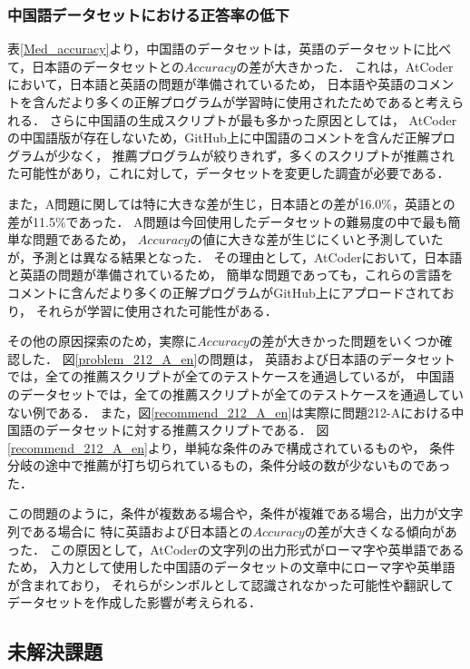   \subsubsection{中国語データセットにおける正答率の低下}
  表\ref{Med_accuracy}より，中国語のデータセットは，英語のデータセットに比べて，日本語のデータセットとの$Accuracy$の差が大きかった．
  これは，AtCoder\cite{AtCoder}において，日本語と英語の問題が準備されているため，
  日本語や英語のコメントを含んだより多くの正解プログラムが学習時に使用されたためであると考えられる．
  さらに中国語の生成スクリプトが最も多かった原因としては，
  AtCoderの中国語版が存在しないため，GitHub上に中国語のコメントを含んだ正解プログラムが少なく，
  推薦プログラムが絞りきれず，多くのスクリプトが推薦された可能性があり，これに対して，データセットを変更した調査が必要である．
  
  また，A問題に関しては特に大きな差が生じ，日本語との差が16.0\%，英語との差が11.5\%であった．
  A問題は今回使用したデータセットの難易度の中で最も簡単な問題であるため，
  $Accuracy$の値に大きな差が生じにくいと予測していたが，予測とは異なる結果となった．
  その理由として，AtCoder\cite{AtCoder}において，日本語と英語の問題が準備されているため，
  簡単な問題であっても，これらの言語をコメントに含んだより多くの正解プログラムがGitHub上にアプロードされており，
  それらが学習に使用された可能性がある．

  その他の原因探索のため，実際に$Accuracy$の差が大きかった問題をいくつか確認した．
  図\ref{problem_212_A_en}の問題は，
  英語および日本語のデータセットでは，全ての推薦スクリプトが全てのテストケースを通過しているが，
  中国語のデータセットでは，全ての推薦スクリプトが全てのテストケースを通過していない例である．
  また，図\ref{recommend_212_A_en}は実際に問題212-Aにおける中国語のデータセットに対する推薦スクリプトである．
  図\ref{recommend_212_A_en}より，単純な条件のみで構成されているものや，
  条件分岐の途中で推薦が打ち切られているもの，条件分岐の数が少ないものであった．
  
  この問題のように，条件が複数ある場合や，条件が複雑である場合，出力が文字列である場合に
  特に英語および日本語との$Accuracy$の差が大きくなる傾向があった．
  この原因として，AtCoderの文字列の出力形式がローマ字や英単語であるため，
  入力として使用した中国語のデータセットの文章中にローマ字や英単語が含まれており，
  それらがシンボルとして認識されなかった可能性や翻訳してデータセットを作成した影響が考えられる．


  \subsection{未解決課題\label{open_issues}}
